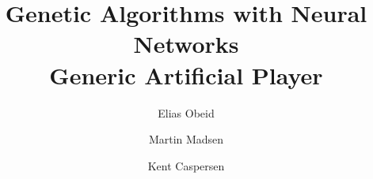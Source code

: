 \documentclass{ecai2014}
\begin{document}
\title{Genetic Algorithms with Neural Networks \\
Generic Artificial Player}
\author{Elias Obeid \and Martin Madsen \and Kent Caspersen
}

\maketitle




\end{document}

